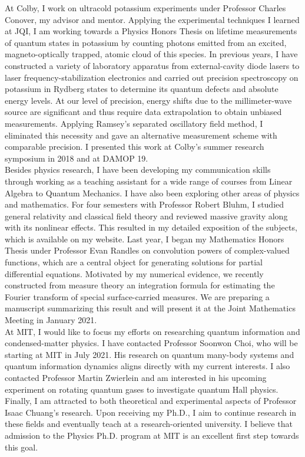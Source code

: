 \documentclass[12pt]{article}
\begin{document}
At Colby, I work on ultracold potassium experiments under Professor Charles Conover, my advisor and mentor. Applying the experimental techniques I learned at JQI, I am working towards a Physics Honors Thesis on lifetime measurements of quantum states in potassium by counting photons emitted from an excited, magneto-optically trapped, atomic cloud of this species. In previous years, I have constructed a variety of laboratory apparatus from external-cavity diode lasers to laser frequency-stabilization electronics and carried out precision spectroscopy on potassium in Rydberg states to determine its quantum defects and absolute energy levels. At our level of precision, energy shifts due to the millimeter-wave source are significant and thus require data extrapolation to obtain unbiased measurements. Applying Ramsey's separated oscillatory field method, I eliminated this necessity and gave an alternative measurement scheme with comparable precision. I presented this work at Colby's summer research symposium in 2018 and at DAMOP 19.  \\

Besides physics research, I have been developing my communication skills through working as a teaching assistant for a wide range of courses from Linear Algebra to Quantum Mechanics. I have also been exploring other areas of physics and mathematics. For four semesters with Professor Robert Bluhm, I studied general relativity and classical field theory and reviewed massive gravity along with its nonlinear effects. This resulted in my detailed exposition of the subjects, which is available on my website. Last year, I began my Mathematics Honors Thesis under Professor Evan Randles on convolution powers of complex-valued functions, which are a central object for generating solutions for partial differential equations. Motivated by my numerical evidence, we recently constructed from measure theory an integration formula for estimating the Fourier transform of special surface-carried measures. We are preparing a manuscript summarizing this result and will present it at the Joint Mathematics Meeting in January 2021. \\ 

At MIT, I would like to focus my efforts on researching quantum information and condensed-matter physics. I have contacted Professor Soonwon Choi, who will be starting at MIT in July 2021. His research on quantum many-body systems and quantum information dynamics aligns directly with my current interests. I also contacted Professor Martin Zwierlein and am interested in his upcoming experiment on rotating quantum gases to investigate quantum Hall physics. Finally, I am attracted to both theoretical and experimental aspects of Professor Isaac Chuang's research. Upon receiving my Ph.D., I aim to continue research in these fields and eventually teach at a research-oriented university. I believe that admission to the Physics Ph.D. program at MIT is an excellent first step towards this goal. \\
\end{document}
